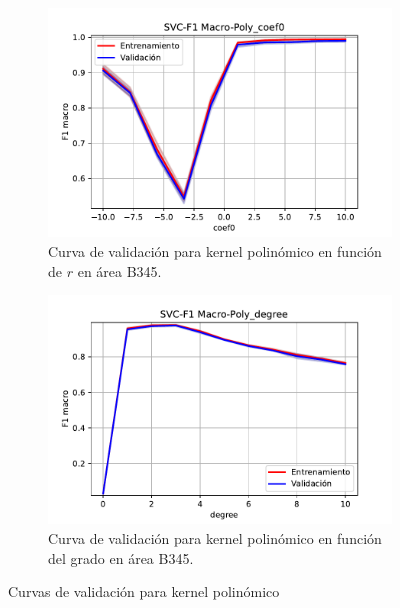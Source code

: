 \begin{figure}[H]
	\captionsetup{justification=centering}
	\centering
	\begin{subfigure}[b]{.45\linewidth}
		\includegraphics[width=\linewidth]{imagenes/resultados/svm/curvas_validacion/b345/SVC-F1 Macro-Poly_coef0.pdf}
		\caption{Curva de validación para kernel polinómico en función de $r$ en área B345.}
		\label{res:svc_vc_poly_coef0_b345}
	\end{subfigure}
	\begin{subfigure}[b]{.45\linewidth}
		\includegraphics[width=\linewidth]{imagenes/resultados/svm/curvas_validacion/b345/SVC-F1 Macro-Poly_degree.pdf}
		\caption{Curva de validación para kernel polinómico en función del grado en área B345.}
		\label{res:svc_vc_poly_degree_b345}
	\end{subfigure}
	\caption{Curvas de validación para kernel polinómico}
	\label{res:svc_vc_poly_kernel_b345}
\end{figure}

